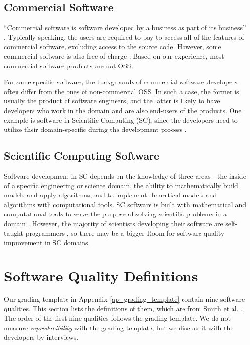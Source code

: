 \subsection{Commercial Software}
``Commercial software is software developed by a business as part of its business'' \cite{GNU2019}.
Typically speaking, the users are required to pay to access all of the features of commercial software, excluding access to the source code. However, some commercial software is also free of charge \cite{GNU2019}. Based on our experience, most commercial software products are not OSS.

For some specific software, the backgrounds of commercial software developers often differ from the ones of non-commercial OSS. In such a case, the former is usually the product of software engineers, and the latter is likely to have developers who work in the domain and are also end-users of the products. One example is software in Scientific Computing (SC), since the developers need to utilize their domain-specific during the development process \cite{WilsonEtAl2014}.

\subsection{Scientific Computing Software}
Software development in SC depends on the knowledge of three areas - the inside of a specific engineering or science domain, the ability to mathematically build models and apply algorithms, and to implement theoretical models and algorithms with computational tools. SC software is built with mathematical and computational tools to serve the purpose of solving scientific problems in a domain \cite{Mehta2015}. However, the majority of scientists developing their software are self-taught programmers \cite{WilsonEtAl2014}, so there may be a bigger Room for software quality improvement in SC domains.

\section{Software Quality Definitions}
\label{sec_software_quality}

Our grading template in Appendix \ref{ap_grading_template} contain nine software qualities. This section lists the definitions of them, which are from Smith et al. \cite{SmithEtAl2020}. The order of the first nine qualities follows the grading template. We do not measure \textit{reproducibility} with the grading template, but we discuss it with the developers by interviews.

